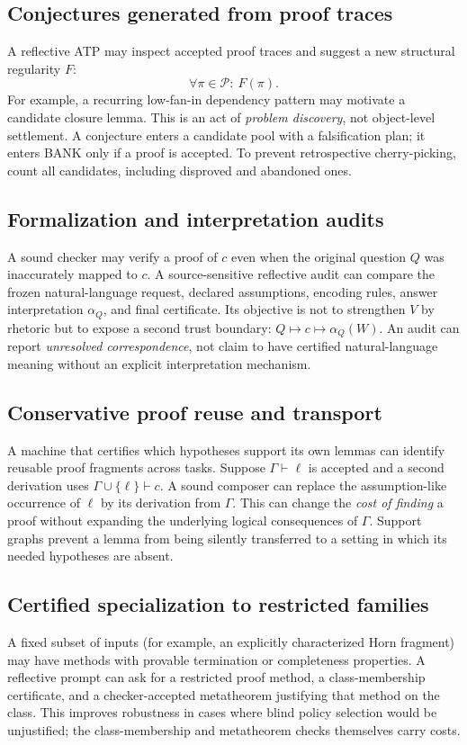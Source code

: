 \documentclass[11pt,letterpaper]{article}
\begin{document}
\subsection{Conjectures generated from proof traces}
A reflective ATP may inspect accepted proof traces and suggest a new structural regularity $F$:
\[
\forall\pi\in\mathcal P:\ F(\pi).
\]
For example, a recurring low-fan-in dependency pattern may motivate a candidate closure lemma. This is an act of \emph{problem discovery}, not object-level settlement. A conjecture enters a candidate pool with a falsification plan; it enters BANK only if a proof is accepted. To prevent retrospective cherry-picking, count all candidates, including disproved and abandoned ones.

\subsection{Formalization and interpretation audits}
A sound checker may verify a proof of $c$ even when the original question $Q$ was inaccurately mapped to $c$. A source-sensitive reflective audit can compare the frozen natural-language request, declared assumptions, encoding rules, answer interpretation $\alpha_Q$, and final certificate. Its objective is not to strengthen $V$ by rhetoric but to expose a second trust boundary: $Q\mapsto c\mapsto\alpha_Q(W)$. An audit can report \emph{unresolved correspondence}, not claim to have certified natural-language meaning without an explicit interpretation mechanism.

\subsection{Conservative proof reuse and transport}
A machine that certifies which hypotheses support its own lemmas can identify reusable proof fragments across tasks. Suppose $\Gamma\vdash\ell$ is accepted and a second derivation uses $\Gamma\cup\{\ell\}\vdash c$. A sound composer can replace the assumption-like occurrence of $\ell$ by its derivation from $\Gamma$. This can change the \emph{cost of finding} a proof without expanding the underlying logical consequences of $\Gamma$. Support graphs prevent a lemma from being silently transferred to a setting in which its needed hypotheses are absent.

\subsection{Certified specialization to restricted families}
A fixed subset of inputs (for example, an explicitly characterized Horn fragment) may have methods with provable termination or completeness properties. A reflective prompt can ask for a restricted proof method, a class-membership certificate, and a checker-accepted metatheorem justifying that method on the class. This improves robustness in cases where blind policy selection would be unjustified; the class-membership and metatheorem checks themselves carry costs.
\end{document}
